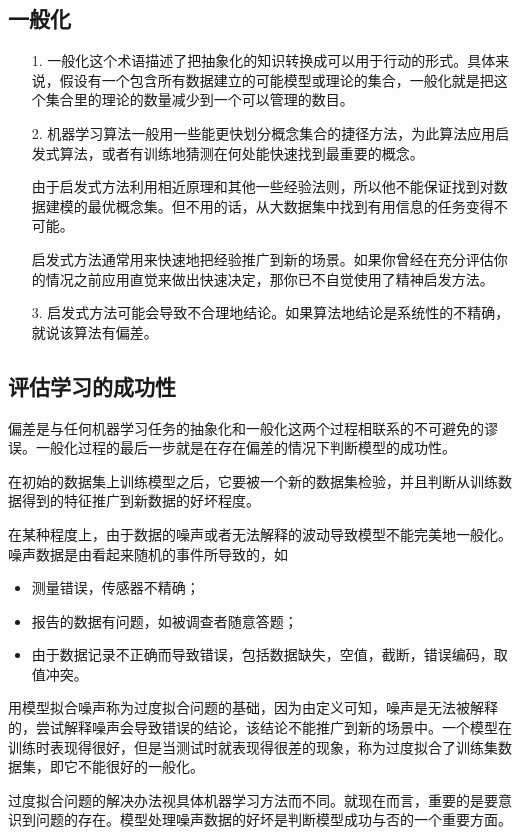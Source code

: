\documentclass[11pt,a4paper,oneside]{book}
\begin{document}
\subsection{一般化}
\begin{enumerate}
	\item[1.]一般化这个术语描述了把抽象化的知识转换成可以用于行动的形式。具体来说，假设有一个包含所有数据建立的可能模型或理论的集合，一般化就是把这个集合里的理论的数量减少到一个可以管理的数目。
	\item[2.]机器学习算法一般用一些能更快划分概念集合的捷径方法，为此算法应用启发式算法，或者有训练地猜测在何处能快速找到最重要的概念。
	
	由于启发式方法利用相近原理和其他一些经验法则，所以他不能保证找到对数据建模的最优概念集。但不用的话，从大数据集中找到有用信息的任务变得不可能。
	
	启发式方法通常用来快速地把经验推广到新的场景。如果你曾经在充分评估你的情况之前应用直觉来做出快速决定，那你已不自觉使用了精神启发方法。
	\item[3.]启发式方法可能会导致不合理地结论。如果算法地结论是系统性的不精确，就说该算法有偏差。
\end{enumerate}
\subsection{评估学习的成功性}
偏差是与任何机器学习任务的抽象化和一般化这两个过程相联系的不可避免的谬误。一般化过程的最后一步就是在存在偏差的情况下判断模型的成功性。

在初始的数据集上训练模型之后，它要被一个新的数据集检验，并且判断从训练数据得到的特征推广到新数据的好坏程度。

在某种程度上，由于数据的噪声或者无法解释的波动导致模型不能完美地一般化。噪声数据是由看起来随机的事件所导致的，如
\begin{itemize}
	\item 测量错误，传感器不精确；
	\item 报告的数据有问题，如被调查者随意答题；
	\item 由于数据记录不正确而导致错误，包括数据缺失，空值，截断，错误编码，取值冲突。
\end{itemize}

用模型拟合噪声称为过度拟合问题的基础，因为由定义可知，噪声是无法被解释的，尝试解释噪声会导致错误的结论，该结论不能推广到新的场景中。一个模型在训练时表现得很好，但是当测试时就表现得很差的现象，称为过度拟合了训练集数据集，即它不能很好的一般化。

过度拟合问题的解决办法视具体机器学习方法而不同。就现在而言，重要的是要意识到问题的存在。模型处理噪声数据的好坏是判断模型成功与否的一个重要方面。
\end{document}
